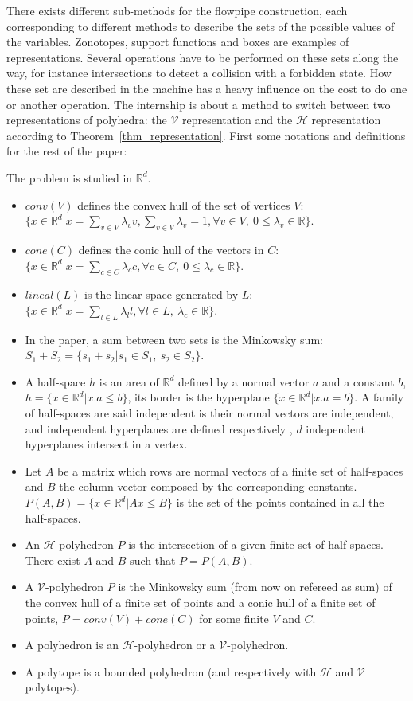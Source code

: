 There exists different sub-methods for the flowpipe construction, each corresponding to different methods to describe the sets of the possible values of the variables. Zonotopes, support functions and boxes are examples of representations. Several operations have to be performed on these sets along the way, for instance intersections to detect a collision with a forbidden state. How these set are described in the machine has a heavy influence on the cost to do one or another operation. The internship is about a method to switch between two representations of polyhedra: the $\mathcal{V}$ representation and the $\mathcal{H}$ representation according to Theorem~\ref{thm_representation}. First some notations and definitions for the rest of the paper:
 
\begin{definition}
	The problem is studied in $\mathbb{R}^d$.
	\begin{itemize}
	\item $conv(V)$ defines the convex hull of the set of vertices $V$: $\{ x\in\mathbb{R}^d| x=\sum_{v\in V} \lambda_v v, \sum_{v\in V} \lambda_v =1, \forall v \in V, \ 0\leq \lambda_v \in \mathbb{R} \}$.
	\item $cone(C)$ defines the conic hull of the vectors in $C$: $\{ x\in\mathbb{R}^d| x=\sum_{c\in C} \lambda_c c, \forall c \in C,\ 0\leq \lambda_c \in \mathbb{R} \}$.
	\item $lineal(L)$ is the linear space generated by $L$: $\{ x\in\mathbb{R}^d| x=\sum_{l\in L} \lambda_l l, \forall l \in L,\ \lambda_c \in \mathbb{R} \}$. 
	\item In the paper, a sum between two sets is the Minkowsky sum: $S_1+S_2=\{s_1+s_2|s_1\in S_1,\ s_2 \in S_2 \}$.
	\item A half-space $h$ is an area of $\mathbb{R}^d$ defined by a normal vector $a$ and a constant $b$, $h=\{x\in\mathbb{R}^d|x.a\leq b\}$, its border is the hyperplane $\{x\in\mathbb{R}^d|x.a = b\}$. A family of half-spaces are said independent is their normal vectors are independent, and independent hyperplanes are defined respectively , $d$ independent hyperplanes intersect in a vertex.
	\item Let $A$ be a matrix which rows are normal vectors of a finite set of half-spaces and $B$ the column vector composed by the corresponding constants. $P(A,B)=\{x\in\mathbb{R}^d|Ax\leq B\}$ is the set of the points contained in all the half-spaces.
	\item An $\mathcal{H}$-polyhedron $P$ is the intersection of a given finite set of half-spaces. There exist $A$ and $B$ such that $P=P(A,B)$.
	\item A $\mathcal{V}$-polyhedron $P$ is the Minkowsky sum (from now on refereed as sum) of the convex hull of a finite set of points and a conic hull of a finite set of points, $P=conv(V)+cone(C)$ for some finite $V$ and $C$.
	\item A polyhedron is an $\mathcal{H}$-polyhedron or a $\mathcal{V}$-polyhedron.
	\item A polytope is a bounded polyhedron (and respectively with $\mathcal{H}$ and $\mathcal{V}$ polytopes).
	\end{itemize}
\end{definition}
 

